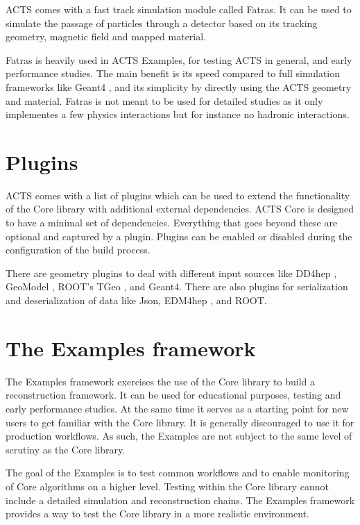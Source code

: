 ACTS comes with a fast track simulation module called Fatras. It can be used to simulate the passage of particles through a detector based on its tracking geometry, magnetic field and mapped material.

Fatras is heavily used in ACTS Examples, for testing ACTS in general, and early performance studies. The main benefit is its speed compared to full simulation frameworks like Geant4 \cite{geant4-2003}\cite{geant4-2006}\cite{geant4-2016}, and its simplicity by directly using the ACTS geometry and material. Fatras is not meant to be used for detailed studies as it only implementes a few physics interactions but for instance no hadronic interactions.

\section{Plugins}

ACTS comes with a list of plugins which can be used to extend the functionality of the Core library with additional external dependencies. ACTS Core is designed to have a minimal set of dependencies. Everything that goes beyond these are optional and captured by a plugin. Plugins can be enabled or disabled during the configuration of the build process.

There are geometry plugins to deal with different input sources like DD4hep \cite{dd4hep}, GeoModel \cite{geomodel}, ROOT's TGeo \cite{root}, and Geant4. There are also plugins for serialization and deserialization of data like Json, EDM4hep \cite{edm4hep}, and ROOT.

\section{The Examples framework}

The Examples framework exercises the use of the Core library to build a reconstruction framework. It can be used for educational purposes, testing and early performance studies. At the same time it serves as a starting point for new users to get familiar with the Core library. It is generally discouraged to use it for production workflows. As such, the Examples are not subject to the same level of scrutiny as the Core library.

The goal of the Examples is to test common workflows and to enable monitoring of Core algorithms on a higher level. Testing within the Core library cannot include a detailed simulation and reconstruction chains. The Examples framework provides a way to test the Core library in a more realistic environment.

